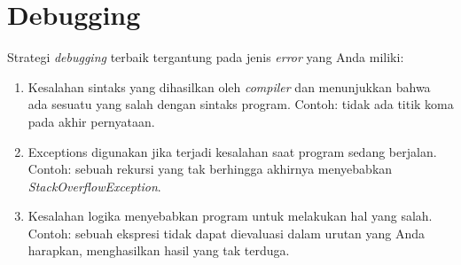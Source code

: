
\setcounter{chapter}{3}
\renewcommand{\thechapter}{\Alph{chapter}} 



%

\chapter{Debugging}

Strategi \textit{debugging} terbaik tergantung pada jenis \textit{error} yang Anda miliki:
\begin{enumerate}
    \item Kesalahan sintaks yang dihasilkan oleh \textit{compiler} dan menunjukkan bahwa ada sesuatu yang salah dengan sintaks program. Contoh: tidak ada titik koma pada akhir pernyataan.
    \item Exceptions digunakan jika terjadi kesalahan saat program sedang berjalan. Contoh: sebuah rekursi yang tak berhingga akhirnya menyebabkan \textit{StackOverflowException}.
    \item Kesalahan logika menyebabkan program untuk melakukan hal yang salah. Contoh: sebuah ekspresi tidak dapat dievaluasi dalam urutan yang Anda harapkan, menghasilkan hasil yang tak terduga.
\end{enumerate}

